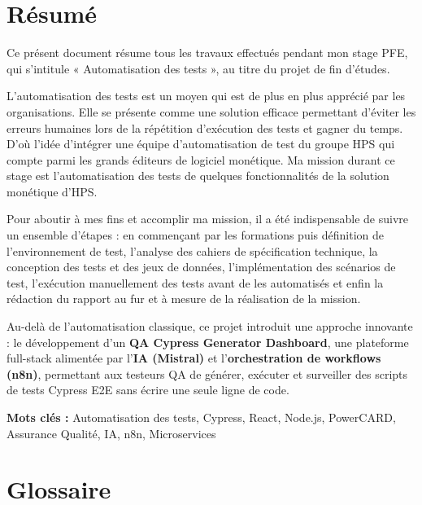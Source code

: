 \newpage
\chapter*{Résumé}

{\fontsize{14}{17}\selectfont
Ce présent document résume tous les travaux effectués pendant mon stage PFE, qui s'intitule « Automatisation des tests », au titre du projet de fin d'études.

L'automatisation des tests est un moyen qui est de plus en plus apprécié par les organisations. Elle se présente comme une solution efficace permettant d'éviter les erreurs humaines lors de la répétition d'exécution des tests et gagner du temps. D'où l'idée d'intégrer une équipe d'automatisation de test du groupe HPS qui compte parmi les grands éditeurs de logiciel monétique. Ma mission durant ce stage est l'automatisation des tests de quelques fonctionnalités de la solution monétique d'HPS.

Pour aboutir à mes fins et accomplir ma mission, il a été indispensable de suivre un ensemble d'étapes : en commençant par les formations puis définition de l'environnement de test, l'analyse des cahiers de spécification technique, la conception des tests et des jeux de données, l'implémentation des scénarios de test, l'exécution manuellement des tests avant de les automatisés et enfin la rédaction du rapport au fur et à mesure de la réalisation de la mission.

Au-delà de l'automatisation classique, ce projet introduit une approche innovante : le développement d'un \textbf{QA Cypress Generator Dashboard}, une plateforme full-stack alimentée par l'\textbf{IA (Mistral)} et l'\textbf{orchestration de workflows (n8n)}, permettant aux testeurs QA de générer, exécuter et surveiller des scripts de tests Cypress E2E sans écrire une seule ligne de code.

\vspace{10pt}
\textbf{Mots clés :} Automatisation des tests, Cypress, React, Node.js, PowerCARD, Assurance Qualité, IA, n8n, Microservices
}

\newpage
\chapter*{Glossaire}

